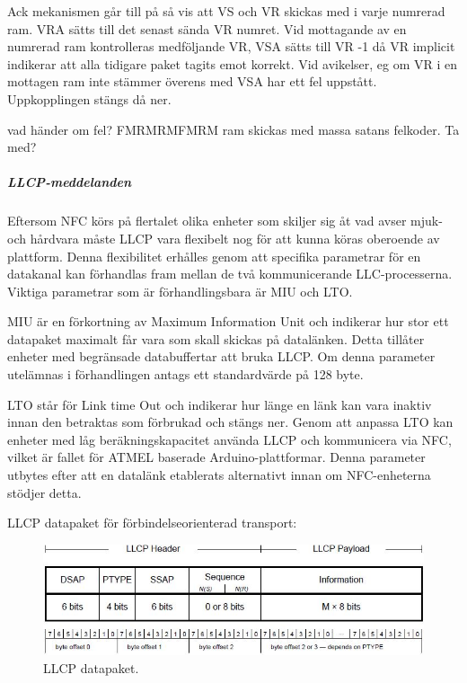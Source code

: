 \documentclass[11pt]{article}
\begin{document}
Ack mekanismen går till på så vis att VS och VR skickas med i varje numrerad ram. VRA sätts till det senast sända VR numret. Vid mottagande av en numrerad ram kontrolleras medföljande VR, VSA sätts till VR -1 då VR implicit indikerar att alla tidigare paket tagits emot korrekt. Vid avikelser, eg om VR i en mottagen ram inte stämmer överens med VSA har ett fel uppstått. Uppkopplingen stängs då ner.

vad händer om fel? FMRMRMFMRM ram skickas med massa satans felkoder. Ta med?

\subparagraph{LLCP-meddelanden}
Eftersom NFC körs på flertalet olika enheter som skiljer sig åt vad avser mjuk- och hårdvara måste LLCP vara flexibelt nog för att kunna köras oberoende av plattform. Denna flexibilitet erhålles genom att specifika parametrar för en datakanal kan förhandlas fram mellan de två kommunicerande LLC-processerna. Viktiga parametrar som är förhandlingsbara är MIU och LTO. 

MIU är en förkortning av Maximum Information Unit och indikerar hur stor ett datapaket maximalt får vara som skall skickas på datalänken. Detta tillåter enheter med begränsade databuffertar att bruka LLCP. Om denna parameter utelämnas i förhandlingen antags ett standardvärde på 128 byte. 

LTO står för Link time Out och indikerar hur länge en länk kan vara inaktiv innan den betraktas som förbrukad och stängs ner. Genom att anpassa LTO kan enheter med låg beräkningskapacitet använda LLCP och kommunicera via NFC, vilket är fallet för ATMEL baserade Arduino-plattformar. Denna parameter utbytes efter att en datalänk etablerats alternativt innan om NFC-enheterna stödjer detta.

LLCP datapaket för förbindelseorienterad transport: 

\begin{figure}[H]
\centering
\includegraphics[scale=0.7]{LLCP_datapaket.jpg}
\caption{LLCP datapaket.}
\label{fig:LLCP_datapaket}
\end{figure}
\end{document}
